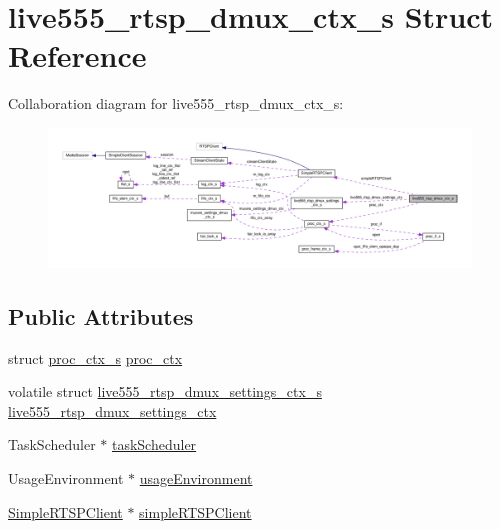 \hypertarget{structlive555__rtsp__dmux__ctx__s}{}\section{live555\+\_\+rtsp\+\_\+dmux\+\_\+ctx\+\_\+s Struct Reference}
\label{structlive555__rtsp__dmux__ctx__s}


Collaboration diagram for live555\+\_\+rtsp\+\_\+dmux\+\_\+ctx\+\_\+s\+:\nopagebreak
\begin{figure}[H]
\begin{center}
\leavevmode
\includegraphics[width=350pt]{structlive555__rtsp__dmux__ctx__s__coll__graph}
\end{center}
\end{figure}
\subsection*{Public Attributes}
\begin{DoxyCompactItemize}
\item 
struct \hyperlink{structproc__ctx__s}{proc\+\_\+ctx\+\_\+s} \hyperlink{structlive555__rtsp__dmux__ctx__s_aa791deca78228791b72b86da1b74bd20}{proc\+\_\+ctx}
\item 
volatile struct \hyperlink{structlive555__rtsp__dmux__settings__ctx__s}{live555\+\_\+rtsp\+\_\+dmux\+\_\+settings\+\_\+ctx\+\_\+s} \hyperlink{structlive555__rtsp__dmux__ctx__s_a0bc32363e8188adb69ea357277bf9620}{live555\+\_\+rtsp\+\_\+dmux\+\_\+settings\+\_\+ctx}
\item 
Task\+Scheduler $\ast$ \hyperlink{structlive555__rtsp__dmux__ctx__s_a3211e63d383d152dbaa3348b638af6ae}{task\+Scheduler}
\item 
Usage\+Environment $\ast$ \hyperlink{structlive555__rtsp__dmux__ctx__s_ad86f6a45f1dc7215e6fe07ccf91be065}{usage\+Environment}
\item 
\hyperlink{classSimpleRTSPClient}{Simple\+R\+T\+S\+P\+Client} $\ast$ \hyperlink{structlive555__rtsp__dmux__ctx__s_a00b7c99aef1216db2e901196d1419059}{simple\+R\+T\+S\+P\+Client}
\end{DoxyCompactItemize}


